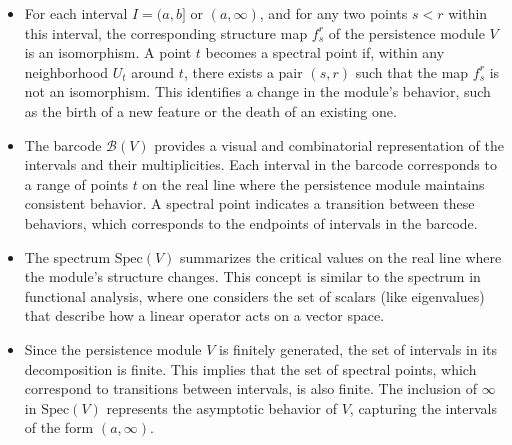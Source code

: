 \begin{remark}\noindent
\begin{itemize}
    \item For each interval $I = (a,b]$ or $(a,\infty)$, and for any two points $s < r$ within this interval, the corresponding structure map $f_{s}^r$ of the persistence module $V$ is an isomorphism. A point $t$ becomes a spectral point if, within any neighborhood $U_t$ around $t$, there exists a pair $(s, r)$ such that the map $f_{s}^r$ is not an isomorphism. This identifies a change in the module's behavior, such as the birth of a new feature or the death of an existing one.
    \item The barcode $\mathcal{B}(V)$ provides a visual and combinatorial representation of the intervals and their multiplicities. Each interval in the barcode corresponds to a range of points $t$ on the real line where the persistence module maintains consistent behavior. A spectral point indicates a transition between these behaviors, which corresponds to the endpoints of intervals in the barcode.
    \item The spectrum $\text{Spec}(V)$ summarizes the critical values on the real line where the module's structure changes. This concept is similar to the spectrum in functional analysis, where one considers the set of scalars (like eigenvalues) that describe how a linear operator acts on a vector space.
    \item Since the persistence module $V$ is finitely generated, the set of intervals in its decomposition is finite. This implies that the set of spectral points, which correspond to transitions between intervals, is also finite. The inclusion of $\infty$ in $\text{Spec}(V)$ represents the asymptotic behavior of $V$, capturing the intervals of the form $(a, \infty)$.
\end{itemize}
\end{remark}

